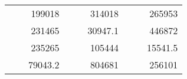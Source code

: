 \begin{table}[H]
\begin{tabular}{|ccrccrccc}
\rowcolor[HTML]{DAE8FC} 
\multicolumn{1}{|c|}{\cellcolor[HTML]{FFFFC7}}                                & \multicolumn{1}{c|}{\cellcolor[HTML]{DAE8FC}}                      & \multicolumn{1}{r|}{\cellcolor[HTML]{DAE8FC}199018}    & \multicolumn{1}{c|}{\cellcolor[HTML]{FFFFC7}}                                & \multicolumn{1}{c|}{\cellcolor[HTML]{DAE8FC}}                       & \multicolumn{1}{r|}{\cellcolor[HTML]{DAE8FC}314018}    & \multicolumn{1}{c|}{\cellcolor[HTML]{FFFFC7}}                                & \multicolumn{1}{c|}{\cellcolor[HTML]{DAE8FC}}                      & \multicolumn{1}{r|}{\cellcolor[HTML]{DAE8FC}265953}    \\ \cline{3-3} \cline{6-6} \cline{9-9} 
\multicolumn{1}{|c|}{\cellcolor[HTML]{FFFFC7}}                                & \multicolumn{1}{c|}{\cellcolor[HTML]{DAE8FC}}                      & \multicolumn{1}{r|}{\cellcolor[HTML]{DDFDFF}231465}    & \multicolumn{1}{c|}{\cellcolor[HTML]{FFFFC7}}                                & \multicolumn{1}{c|}{\cellcolor[HTML]{DAE8FC}}                       & \multicolumn{1}{r|}{\cellcolor[HTML]{DDFDFF}30947.1}   & \multicolumn{1}{c|}{\cellcolor[HTML]{FFFFC7}}                                & \multicolumn{1}{c|}{\cellcolor[HTML]{DAE8FC}}                      & \multicolumn{1}{r|}{\cellcolor[HTML]{DDFDFF}446872}    \\ \cline{3-3} \cline{6-6} \cline{9-9} 
\rowcolor[HTML]{DAE8FC} 
\multicolumn{1}{|c|}{\cellcolor[HTML]{FFFFC7}}                                & \multicolumn{1}{c|}{\cellcolor[HTML]{DAE8FC}}                      & \multicolumn{1}{r|}{\cellcolor[HTML]{DAE8FC}235265}    & \multicolumn{1}{c|}{\cellcolor[HTML]{FFFFC7}}                                & \multicolumn{1}{c|}{\cellcolor[HTML]{DAE8FC}}                       & \multicolumn{1}{r|}{\cellcolor[HTML]{DAE8FC}105444}    & \multicolumn{1}{c|}{\cellcolor[HTML]{FFFFC7}}                                & \multicolumn{1}{c|}{\cellcolor[HTML]{DAE8FC}}                      & \multicolumn{1}{r|}{\cellcolor[HTML]{DAE8FC}15541.5}   \\ \cline{3-3} \cline{6-6} \cline{9-9} 
\multicolumn{1}{|c|}{\cellcolor[HTML]{FFFFC7}}                                & \multicolumn{1}{c|}{\cellcolor[HTML]{DAE8FC}}                      & \multicolumn{1}{r|}{\cellcolor[HTML]{DDFDFF}79043.2}   & \multicolumn{1}{c|}{\cellcolor[HTML]{FFFFC7}}                                & \multicolumn{1}{c|}{\cellcolor[HTML]{DAE8FC}}                       & \multicolumn{1}{r|}{\cellcolor[HTML]{DDFDFF}804681}    & \multicolumn{1}{c|}{\cellcolor[HTML]{FFFFC7}}                                & \multicolumn{1}{c|}{\cellcolor[HTML]{DAE8FC}}                      & \multicolumn{1}{r|}{\cellcolor[HTML]{DDFDFF}256101}    \\ \cline{3-3} \cline{6-6} \cline{9-9} 

\end{tabular}
\end{table}

